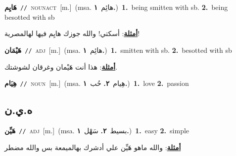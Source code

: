 \documentclass[10pt,a4paper,twoside]{article} %
\begin{document}
\begin{multicols}{2}
{\setlength\topsep{0pt}\textbf{\foreignlanguage{arabic}{هَايِم}}\ {\color{gray}\texttt{//}\color{black}}\ \textsc{noun\textunderscore act}\ [m.]\ \color{gray}(msa. \foreignlanguage{arabic}{هائِم}~\foreignlanguage{arabic}{\textbf{١.}})\color{black}\ \textbf{1.}~being smitten with sb.  \textbf{2.}~being besotted with sb\  \begin{flushright}\color{gray}\foreignlanguage{arabic}{\textbf{\underline{\foreignlanguage{arabic}{أمثلة}}}: أسكتي! والله جوزك هايِم فيها لهالمصرية!}\end{flushright}\color{black}} \vspace{2mm}

{\setlength\topsep{0pt}\textbf{\foreignlanguage{arabic}{هَيْمَان}}\ {\color{gray}\texttt{//}\color{black}}\ \textsc{adj}\ [m.]\ \color{gray}(msa. \foreignlanguage{arabic}{هائِم}~\foreignlanguage{arabic}{\textbf{١.}})\color{black}\ \textbf{1.}~smitten with sb.  \textbf{2.}~besotted with sb\  \begin{flushright}\color{gray}\foreignlanguage{arabic}{\textbf{\underline{\foreignlanguage{arabic}{أمثلة}}}: هذا أنت هَيْمان وغرقان لشوشتك.}\end{flushright}\color{black}} \vspace{2mm}

{\setlength\topsep{0pt}\textbf{\foreignlanguage{arabic}{هِيَام}}\ {\color{gray}\texttt{//}\color{black}}\ \textsc{noun}\ [m.]\ \color{gray}(msa. \foreignlanguage{arabic}{هِيام}~\foreignlanguage{arabic}{\textbf{٢.}}  \foreignlanguage{arabic}{حُب}~\foreignlanguage{arabic}{\textbf{١.}})\color{black}\ \textbf{1.}~love  \textbf{2.}~passion\ } \vspace{2mm}

\vspace{-3mm}
\subsection*{\color{blue}\foreignlanguage{arabic}{ه.ي.ن}\color{blue}{}} 

{\setlength\topsep{0pt}\textbf{\foreignlanguage{arabic}{هَيِّن}}\ {\color{gray}\texttt{//}\color{black}}\ \textsc{adj}\ [m.]\ \color{gray}(msa. \foreignlanguage{arabic}{بسيط}~\foreignlanguage{arabic}{\textbf{٢.}}  \foreignlanguage{arabic}{سَهْل}~\foreignlanguage{arabic}{\textbf{١.}})\color{black}\ \textbf{1.}~easy  \textbf{2.}~simple\  \begin{flushright}\color{gray}\foreignlanguage{arabic}{\textbf{\underline{\foreignlanguage{arabic}{أمثلة}}}: والله ماهو هَيِّن علي أدشرك بهالميمعة بس والله مضطر}\end{flushright}\color{black}} \vspace{2mm}


\end{multicols}
\end{document}
